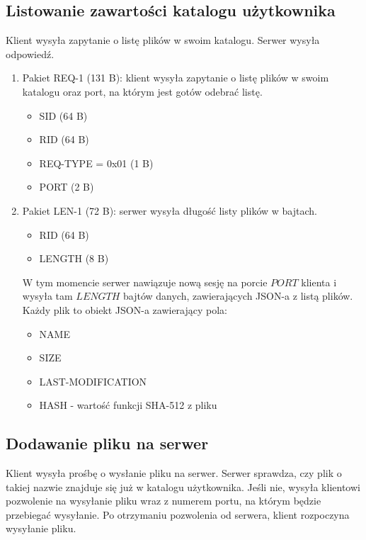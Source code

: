\documentclass{article}
\begin{document}
	\subsection{Listowanie zawartości katalogu użytkownika}
	Klient wysyła zapytanie o listę plików w swoim katalogu. Serwer wysyła odpowiedź. 
	
	\begin{enumerate}
		\item Pakiet REQ-1 \label{REQ-1} (131 B): klient wysyła zapytanie o listę plików w swoim katalogu oraz port, na którym jest gotów odebrać listę. 
		\begin{itemize}
			\item SID (64 B)
			\item RID (64 B)
			\item REQ-TYPE = 0x01 (1 B)
			\item PORT (2 B)
		\end{itemize}
	
		\item Pakiet LEN-1 \label{LEN-1} (72 B): serwer wysyła długość listy plików w bajtach. 
		\begin{itemize}
			\item RID (64 B)
			\item LENGTH (8 B)
		\end{itemize}
	
		W tym momencie serwer nawiązuje nową sesję na porcie $PORT$ klienta i wysyła tam $LENGTH$ bajtów danych, zawierających JSON-a z listą plików. Każdy plik to obiekt JSON-a zawierający pola:
		\begin{itemize}
			\item NAME
			\item SIZE
			\item LAST-MODIFICATION
			\item HASH - wartość funkcji SHA-512 z pliku
		\end{itemize}
		
	\end{enumerate}

	\subsection{Dodawanie pliku na serwer}
	Klient wysyła prośbę o wysłanie pliku na serwer. Serwer sprawdza, czy plik o takiej nazwie znajduje się już w katalogu użytkownika. Jeśli nie, wysyła klientowi pozwolenie na wysyłanie pliku wraz z numerem portu, na którym będzie przebiegać wysyłanie. Po otrzymaniu pozwolenia od serwera, klient rozpoczyna wysyłanie pliku. 
	
\end{document}
